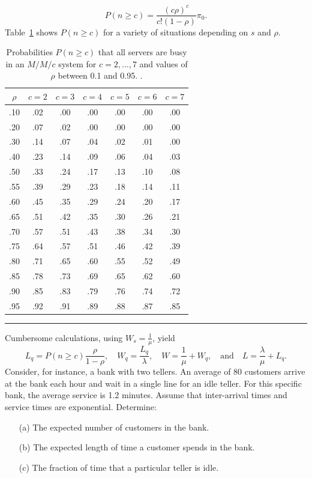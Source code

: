 $$ P( n \geq c) =  \frac{\left(c \rho\right)^{c}}{c! \left(1-\rho\right)} \pi_{0}.$$ 
Table~\ref{tab:pns} shows $P( n \geq c)$ for a variety of situations depending on $s$ and $\rho$.  
\begin{table}[!t]
\centering
\begin{tabular}{ccccccc}
\hline
$\rho$ & $c=2$ & $c=3$ & $c=4$ & $c=5$ & $c=6$ & $c=7$ \\
 \hline
.10& .02& .00& .00& .00& .00& .00 \\
.20& .07& .02& .00& .00& .00& .00 \\
.30& .14& .07& .04& .02& .01& .00 \\
.40& .23& .14& .09& .06& .04& .03 \\
.50& .33& .24& .17& .13& .10& .08 \\
.55& .39& .29& .23& .18& .14& .11 \\
.60& .45& .35& .29& .24& .20& .17 \\
.65& .51& .42& .35& .30& .26& .21 \\
.70& .57& .51& .43& .38& .34& .30 \\
.75& .64& .57& .51& .46& .42& .39 \\
.80& .71& .65& .60& .55& .52& .49 \\
.85& .78& .73& .69& .65& .62& .60 \\
.90& .85& .83& .79& .76& .74& .72 \\
.95& .92& .91& .89& .88& .87& .85 \\
\hline
\end{tabular}
\caption[\small Probabilities that all servers are busy in an $M/M/c$ system]{\small Probabilities $P(n\geq c)$ that all servers are busy in an $M/M/c$ system for $c=2,\ldots, 7$ and values of $\rho$ between 0.1 and 0.95. \cite[p.1088]{QS_W}.}\label{tab:pns}\hrule
\end{table}\afterpage{\FloatBarrier}
Cumbersome calculations, using $W_{s} = \frac{1}{\mu}$, yield $$ L_{q} = P( n \geq c) \frac{\rho}{1-\rho}, \quad 
W_{q} = \frac{L_{q}}{\lambda}, \quad
W = \frac{1}{\mu} + W_{q}, \quad\mbox{and}\quad
 L = \frac{\lambda}{\mu} + L_{q}.$$
\newpage\noindent Consider, for instance, a bank with two tellers. An average of 80 customers arrive at the bank each hour and wait in a single line for an idle teller. For this specific bank, the average service is 1.2 minutes. Assume that inter-arrival times and service times are exponential. Determine:
\begin{itemize}[noitemsep]
	\item[(a)] The expected number of customers in the bank.
	\item[(b)] The expected length of time a customer spends in the bank.
	\item[(c)] The fraction of time that a particular teller is idle.
\end{itemize}
